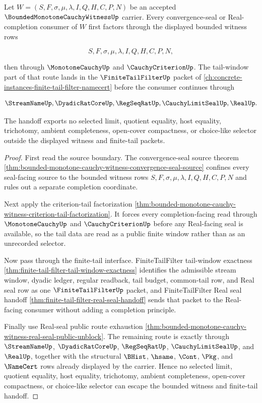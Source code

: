 \begin{theorem}
\label{thm:bounded-monotone-cauchy-witness-finite-tail-filter-handoff}
Let $W=(S,F,\sigma,\mu,\lambda,I,Q,H,C,P,N)$ be an accepted $\BoundedMonotoneCauchyWitnessUp$ carrier. Every convergence-seal or Real-completion consumer of $W$ first factors through the displayed bounded witness rows

$$
S,F,\sigma,\mu,\lambda,I,Q,H,C,P,N,
$$

then through $\MonotoneCauchyUp$ and $\CauchyCriterionUp$. The tail-window part of that route lands in the $\FiniteTailFilterUp$ packet of \autoref{ch:concrete-instances-finite-tail-filter-namecert} before the consumer continues through

$$
\StreamNameUp,\DyadicRatCoreUp,\RegSeqRatUp,\CauchyLimitSealUp,\RealUp.
$$

The handoff exports no selected limit, quotient equality, host equality, trichotomy, ambient completeness, open-cover compactness, or choice-like selector outside the displayed witness and finite-tail packets.
\end{theorem}
\begin{proof}
First read the source boundary. The convergence-seal source theorem \autoref{thm:bounded-monotone-cauchy-witness-convergence-seal-source} confines every seal-facing source to the bounded witness rows $S,F,\sigma,\mu,\lambda,I,Q,H,C,P,N$ and rules out a separate completion coordinate.

Next apply the criterion-tail factorization \autoref{thm:bounded-monotone-cauchy-witness-criterion-tail-factorization}. It forces every completion-facing read through $\MonotoneCauchyUp$ and $\CauchyCriterionUp$ before any Real-facing seal is available, so the tail data are read as a public finite window rather than as an unrecorded selector.

Now pass through the finite-tail interface. FiniteTailFilter tail-window exactness \autoref{thm:finite-tail-filter-tail-window-exactness} identifies the admissible stream window, dyadic ledger, regular readback, tail budget, common-tail row, and Real seal row as one $\FiniteTailFilterUp$ packet, and FiniteTailFilter Real seal handoff \autoref{thm:finite-tail-filter-real-seal-handoff} sends that packet to the Real-facing consumer without adding a completion principle.

Finally use Real-seal public route exhaustion \autoref{thm:bounded-monotone-cauchy-witness-real-seal-public-unblock}. The remaining route is exactly through $\StreamNameUp$, $\DyadicRatCoreUp$, $\RegSeqRatUp$, $\CauchyLimitSealUp$, and $\RealUp$, together with the structural $\BHist$, $\hsame$, $\Cont$, $\Pkg$, and $\NameCert$ rows already displayed by the carrier. Hence no selected limit, quotient equality, host equality, trichotomy, ambient completeness, open-cover compactness, or choice-like selector can escape the bounded witness and finite-tail handoff.
\end{proof}

